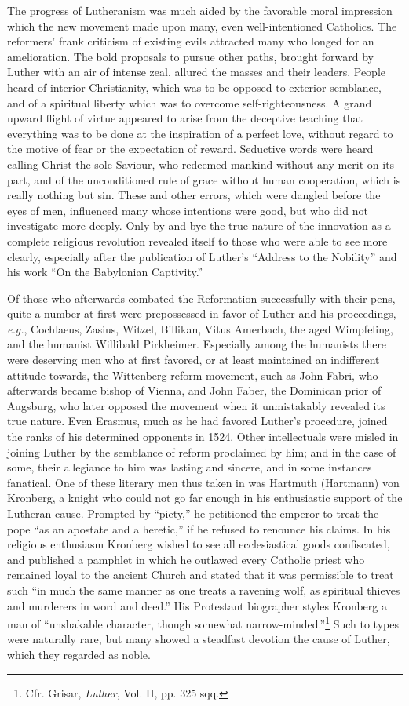 The progress of Lutheranism was much aided by the favorable
moral impression which the new movement made upon many, even
well-intentioned Catholics. The reformers’ frank criticism of existing
evils attracted many who longed for an amelioration. The bold
proposals to pursue other paths, brought forward by Luther with an
air of intense zeal, allured the masses and their leaders. People heard
of interior Christianity, which was to be opposed to exterior semblance,
and of a spiritual liberty which was to overcome self-righteousness. A grand
upward flight of virtue appeared to arise from
the deceptive teaching that everything was to be done at the
inspiration of a perfect love, without regard to the motive of
fear or the expectation of reward. Seductive words were heard
calling Christ the sole Saviour, who redeemed mankind without any
merit on its part, and of the unconditioned rule of grace without
human cooperation, which is really nothing but sin. These
and other errors, which were dangled before the eyes of men, influenced many whose
intentions were good, but who did not investigate more deeply. Only
by and bye the true nature of the innovation as a complete religious
revolution revealed itself to those who were able to see more clearly,
especially after the publication of Luther’s “Address to the Nobility”
and his work “On the Babylonian Captivity.”

Of those who afterwards combated the Reformation successfully
with their pens, quite a number at first were prepossessed in favor of
Luther and his proceedings, \textit{e.g.}, Cochlaeus, Zasius, Witzel, Billikan,
Vitus Amerbach, the aged Wimpfeling, and the humanist Willibald
Pirkheimer. Especially among the humanists there were deserving
men who at first favored, or at least maintained an indifferent attitude
towards, the Wittenberg reform movement, such as John Fabri,
who afterwards became bishop of Vienna, and John Faber, the Dominican prior
of Augsburg, who later opposed the movement when
it unmistakably revealed its true nature. Even Erasmus, much as he
had favored Luther’s procedure, joined the ranks of his determined
opponents in 1524. Other intellectuals were misled in joining Luther
by the semblance of reform proclaimed by him; and in the case of
some, their allegiance to him was lasting and sincere, and in some instances
fanatical. One of these literary men thus taken in was
Hartmuth (Hartmann) von Kronberg, a knight who could not go far
enough in his enthusiastic support of the Lutheran cause. Prompted
by “piety,” he petitioned the emperor to treat the pope “as an apostate
and a heretic,” if he refused to renounce his claims. In his religious
enthusiasm Kronberg wished to see all ecclesiastical goods
confiscated, and published a pamphlet in which he outlawed every
Catholic priest who remained loyal to the ancient Church and stated
that it was permissible to treat such “in much the same manner
as one treats a ravening wolf, as spiritual thieves and murderers in
word and deed.” His Protestant biographer styles Kronberg a man of
“unshakable character, though somewhat narrow-minded.”\footnote
{Cfr. Grisar, \textit{Luther}, Vol. II, pp. 325 sqq.}
Such to types were naturally rare, but many showed a steadfast devotion
the cause of Luther, which they regarded as noble.

